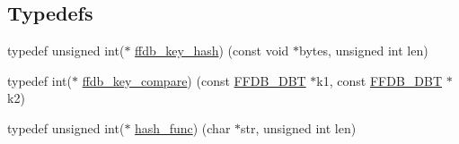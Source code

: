 \subsection*{Typedefs}
\begin{DoxyCompactItemize}
\item 
typedef unsigned int($\ast$ \mbox{\hyperlink{namespaceFILEDB_a62446cf48b614494d5708110ddc414bf}{ffdb\+\_\+key\+\_\+hash}}) (const void $\ast$bytes, unsigned int len)
\item 
typedef int($\ast$ \mbox{\hyperlink{namespaceFILEDB_a1d3bd589ccfab62ecdd78b46aba576e2}{ffdb\+\_\+key\+\_\+compare}}) (const \mbox{\hyperlink{adat-devel_2other__libs_2filedb_2filehash_2ffdb__db_8h_aa2e0984399491df0fdd20898ca8758f9}{F\+F\+D\+B\+\_\+\+D\+BT}} $\ast$k1, const \mbox{\hyperlink{adat-devel_2other__libs_2filedb_2filehash_2ffdb__db_8h_aa2e0984399491df0fdd20898ca8758f9}{F\+F\+D\+B\+\_\+\+D\+BT}} $\ast$k2)
\item 
typedef unsigned int($\ast$ \mbox{\hyperlink{namespaceFILEDB_a9e945e165dd500023ad29b4fcb2332b8}{hash\+\_\+func}}) (char $\ast$str, unsigned int len)
\end{DoxyCompactItemize}
